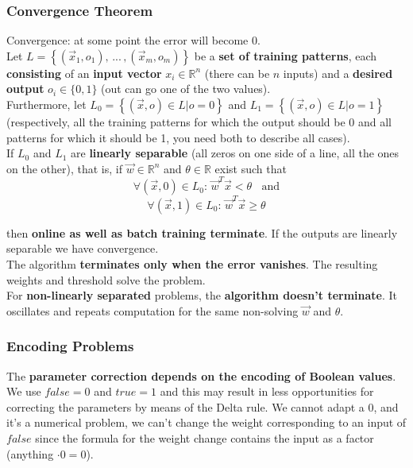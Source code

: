 \newpage

\subsubsection{Convergence Theorem}
Convergence: at some point the error will become 0.\\

Let $L = \left\{ (\vec{x}_1, o_1), \, ... \, , (\vec{x}_m, o_m)\right\}$ be a \textbf{set of training patterns}, each \textbf{consisting} of an \textbf{input vector} $x_i \in \mathbb{R}^n$ (there can be $n$ inputs) and a \textbf{desired output} $o_i \in \{0, 1\}$ (out can go one of the two values).\\

Furthermore, let $L_0 = \left\{\left(\vec{x}, o\right) \in L | o = 0 \right\}$ and $L_1 = \left\{ \left(\vec{x}, o\right) \in L | o = 1\right\}$ (respectively, all the training patterns for which the output should be 0 and all patterns for which it should be 1, you need both to describe all cases).\\

If $L_0$ and $L_1$ are \textbf{linearly separable} (all zeros on one side of a line, all the ones on the other), that is, if $\vec{w} \in \mathbb{R}^n$ and $\theta \in \mathbb{R}$ exist such that
$$ \forall \left(\vec{x}, 0 \right) \in L_0: \, \vec{w}^T \vec{x} < \theta \;\; \text{ and}$$
$$ \forall \left(\vec{x}, 1 \right) \in L_0: \, \vec{w}^T \vec{x} \geq \theta $$

then \textbf{online as well as batch training terminate}. If the outputs are linearly separable we have convergence.\\

The algorithm \textbf{terminates only when the error vanishes}. The resulting weights and threshold solve the problem.\\

For \textbf{non-linearly separated} problems, the \textbf{algorithm doesn't terminate}. It oscillates and repeats computation for the same non-solving $\vec{w}$ and $\theta$.\\

\newpage

\subsubsection{Encoding Problems}
The \textbf{parameter correction depends on the encoding of Boolean values}. We use $false = 0$ and $true = 1$ and this may result in less opportunities for correcting the parameters by means of the Delta rule. We cannot adapt a 0, and it's a numerical problem, we can't change the weight corresponding to an input of $false$ since the formula for the weight change contains the input as a factor (anything $\cdot 0 = 0$).\\

